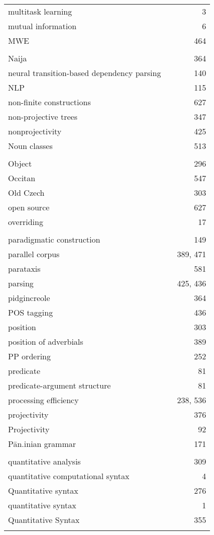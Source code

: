 \documentclass{easychair}
\begin{document}
\begin{longtable}{lp{7em}r}
multitask learning & & 3 
\\
mutual information & & 6 
\\
MWE & & 464 
\\
\\
Naija & & 364 
\\
neural transition-based dependency parsing & & 140 
\\
NLP & & 115 
\\
non-finite constructions & & 627 
\\
non-projective trees & & 347 
\\
nonprojectivity & & 425 
\\
Noun classes & & 513 
\\
\\
Object & & 296 
\\
Occitan & & 547 
\\
Old Czech & & 303 
\\
open source & & 627 
\\
overriding & & 17 
\\
\\
paradigmatic construction & & 149 
\\
parallel corpus & & 389, 471 
\\
parataxis & & 581 
\\
parsing & & 425, 436 
\\
pidgincreole & & 364 
\\
POS tagging & & 436 
\\
position & & 303 
\\
position of adverbials & & 389 
\\
PP ordering & & 252 
\\
predicate & & 81 
\\
predicate-argument structure & & 81 
\\
processing efficiency & & 238, 536 
\\
projectivity & & 376 
\\
Projectivity & & 92 
\\
P\={a}n.inian grammar & & 171 
\\
\\
quantitative analysis & & 309 
\\
quantitative computational syntax & & 4 
\\
Quantitative syntax & & 276 
\\
quantitative syntax & & 1 
\\
Quantitative Syntax & & 355 
\\
\\

\end{longtable}
\end{document}
